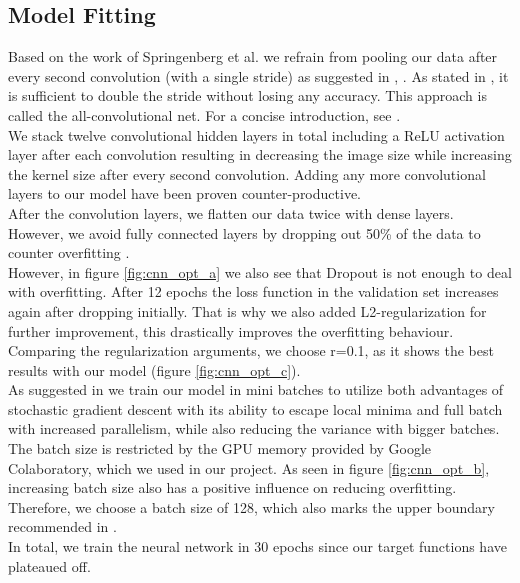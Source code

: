 \subsection{Model Fitting}
Based on the work of Springenberg et al. we refrain from pooling our data after every second convolution (with a single stride) as suggested in \cite{bloem2020deeplearning1}, \cite{karpathy2016convolutional}. As stated in \cite{springenberg2014striving}, it is sufficient to double the stride without losing any accuracy. This approach is called the all-convolutional net. For a concise introduction, see \cite{becker2018}.\\
We stack twelve convolutional hidden layers in total including a ReLU activation layer after each convolution resulting in decreasing the image size while increasing the kernel size after every second convolution. Adding any more convolutional layers to our model have been proven counter-productive.\\ 
After the convolution layers, we flatten our data twice with dense layers. However, we avoid fully connected layers by dropping out 50\% of the data \cite{hinton2012improving} to counter overfitting \cite{srivastava2014dropout}. \\
However, in figure \ref{fig:cnn_opt_a} we also see that Dropout is not enough to deal with overfitting. After 12 epochs the loss function in the validation set increases again after dropping initially. That is why we also added L2-regularization for further improvement, this drastically improves the overfitting behaviour. Comparing the regularization arguments, we choose r=0.1, as it shows the best results with our model (figure \ref{fig:cnn_opt_c}). \\
As suggested in \cite{bloem2020deeplearning1} we train our model in mini batches to utilize both advantages of stochastic gradient descent with its ability to escape local minima and full batch with increased parallelism, while also reducing the variance with bigger batches. The batch size is restricted by the GPU memory provided by Google Colaboratory, which we used in our project. As seen in figure \ref{fig:cnn_opt_b}, increasing batch size also has a positive influence on reducing overfitting. Therefore, we choose a batch size of 128, which also marks the upper boundary recommended in \cite{bloem2020deeplearning1}.\\
In total, we train the neural network in 30 epochs since our target functions have plateaued off.
